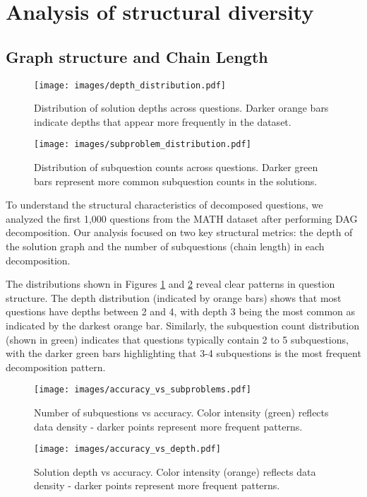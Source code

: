 \appendix
\section{Analysis of structural diversity}
\label{appendix:analysis}
\subsection*{Graph structure and Chain Length}
\begin{figure}[ht]
    \centering
    \texttt{[image: images/depth\_distribution.pdf]} 
    \caption{Distribution of solution depths across questions. Darker orange bars indicate depths that appear more frequently in the dataset.}
    \label{fig:depth_distrib}
\end{figure}
\begin{figure}[ht]
    \centering
    \texttt{[image: images/subproblem\_distribution.pdf]} 
    \caption{Distribution of subquestion counts across questions. Darker green bars represent more common subquestion counts in the solutions.}
    \label{fig:number_distrib}
\end{figure}
To understand the structural characteristics of decomposed questions, we analyzed the first 1,000 questions from the MATH dataset after performing DAG decomposition. Our analysis focused on two key structural metrics: the depth of the solution graph and the number of subquestions (chain length) in each decomposition.

The distributions shown in Figures \ref{fig:depth_distrib} and \ref{fig:number_distrib} reveal clear patterns in question structure. The depth distribution (indicated by orange bars) shows that most questions have depths between 2 and 4, with depth 3 being the most common as indicated by the darkest orange bar. Similarly, the subquestion count distribution (shown in green) indicates that questions typically contain 2 to 5 subquestions, with the darker green bars highlighting that 3-4 subquestions is the most frequent decomposition pattern.

\begin{figure}[ht]
   \centering
   \texttt{[image: images/accuracy\_vs\_subproblems.pdf]}
   \caption{Number of subquestions vs accuracy. Color intensity (green) reflects data density - darker points represent more frequent patterns.}
   \label{fig:accuracy_subquestions}
\end{figure}

\begin{figure}[ht]
   \centering
   \texttt{[image: images/accuracy\_vs\_depth.pdf]}
   \caption{Solution depth vs accuracy. Color intensity (orange) reflects data density - darker points represent more frequent patterns.}
   \label{fig:accuracy_depth}
\end{figure}


